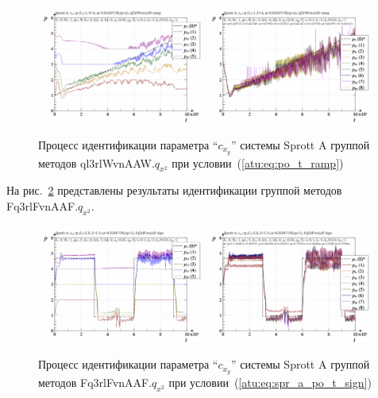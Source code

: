 \begin{figure}[htb!]
  \centerline{
    \includegraphics[width=0.49\textwidth]{p/cha/spr_a/ql3rlWvnAAW_x2/sprott_a_id-p_t_pi_ql3rlWvnAAW_ramp.png}
    \hfill
    \includegraphics[width=0.49\textwidth]{p/cha/spr_a/ql3rlWvnAAW_x2/sprott_a_id-p_t_p_ql3rlWvnAAW_ramp.png}
  }
  \caption{Процесс идентификации параметра ``$c_{x_y}$'' системы Sprott A группой методов ql3rlWvnAAW.$q_{x^2}$ при условии~(\ref{atu:eq:po_t_ramp})}
  \label{atu:f:spr_a_id_ql3rlWvnAAW_q_x2_ramp}
\end{figure}

На рис.~\ref{atu:f:spr_a_id_Fq3rlFvnAAF_q_x2_sign} представлены результаты идентификации
группой методов Fq3rlFvnAAF.$q_{x^2}$.


\begin{figure}[htb!]
  \centerline{
    \includegraphics[width=0.49\textwidth]{p/cha/spr_a/Fq3rlFvnAAF_x2/sprott_a_id-p_t_pi_Fq3rlFvnAAF_sign.png}
    \hfill
    \includegraphics[width=0.49\textwidth]{p/cha/spr_a/Fq3rlFvnAAF_x2/sprott_a_id-p_t_p_Fq3rlFvnAAF_sign.png}
  }
  \caption{Процесс идентификации параметра ``$c_{x_y}$'' системы Sprott A группой методов Fq3rlFvnAAF.$q_{x^2}$ при условии~(\ref{atu:eq:spr_a_po_t_sign})}
  \label{atu:f:spr_a_id_Fq3rlFvnAAF_q_x2_sign}
\end{figure}


